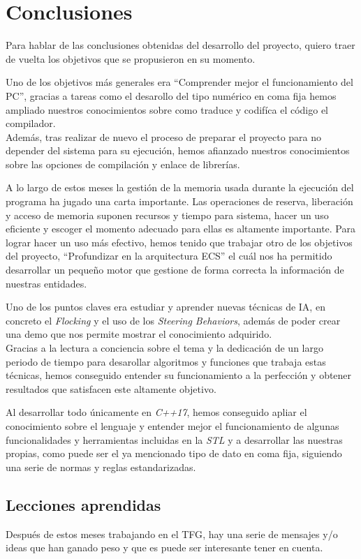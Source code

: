 \chapter{Conclusiones}
Para hablar de las conclusiones obtenidas del desarrollo del proyecto, quiero traer de vuelta los
objetivos que se propusieron en su momento. 

Uno de los objetivos más generales era ``Comprender mejor el funcionamiento del \ac{PC}'', gracias a
tareas como el desarollo del tipo numérico en coma fija hemos ampliado nuestros conocimientos sobre como
traduce y codifíca el código el compilador. \\ Además, tras realizar de nuevo el proceso de preparar el
proyecto para no depender del sistema para su ejecución, hemos afianzado nuestros conocimientos sobre las
opciones de compilación y enlace de librerías.

A lo largo de estos meses la gestión de la memoria usada durante la ejecución del programa ha jugado una
carta importante. Las operaciones de reserva, liberación y acceso de memoria suponen recursos y tiempo
para sistema, hacer un uso eficiente y escoger el momento adecuado para ellas es altamente importante.
Para lograr hacer un uso más efectivo, hemos tenido que trabajar otro de los objetivos del proyecto,
``Profundizar en la arquitectura \ac{ECS}'' el cuál nos ha permitido desarrollar un pequeño motor que
gestione de forma correcta la información de nuestras entidades.

Uno de los puntos claves era estudiar y aprender nuevas técnicas de \ac{IA}, en concreto el
\textit{Flocking} y el uso de los \textit{Steering Behaviors}, además de poder crear una demo que nos
permite mostrar el conocimiento adquirido. \\
Gracias a la lectura a conciencia sobre el tema y la dedicación de un largo periodo de tiempo para
desarollar algoritmos y funciones que trabaja estas técnicas, hemos conseguido entender su
funcionamiento a la perfección y obtener resultados que satisfacen este altamente objetivo.

Al desarrollar todo únicamente en \textit{C++17}, hemos conseguido apliar el conocimiento sobre el lenguaje
y entender mejor el funcionamiento de algunas funcionalidades y herramientas incluidas en la \textit{STL} y
a desarrollar las nuestras propias, como puede ser el ya mencionado tipo de dato en coma fija, siguiendo una
serie de normas y reglas estandarizadas.


\section{Lecciones aprendidas}
Después de estos meses trabajando en el \ac{TFG}, hay una serie de mensajes y/o ideas que han ganado peso y
que es puede ser interesante tener en cuenta.

